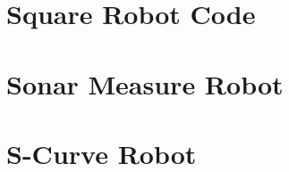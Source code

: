 \documentclass[main.tex]{subfiles}
\begin{document}
\appendix
\label{appendA}

\section{Square Robot Code}
\section{Sonar Measure Robot}
\section{S-Curve Robot}
\end{document}
